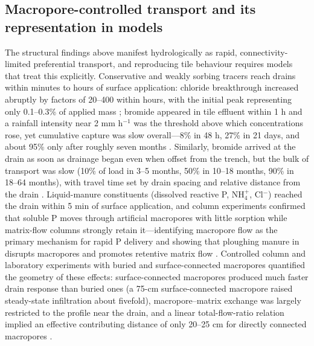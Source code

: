 \subsection{Macropore-controlled transport and its representation in models}

The structural findings above manifest hydrologically as rapid, connectivity-limited
preferential transport, and reproducing tile behaviour requires models that treat this
explicitly. Conservative and weakly sorbing tracers reach drains within minutes to
hours of surface application: chloride breakthrough increased abruptly by factors of
20--400 within hours, with the initial peak representing only 0.1--0.3\% of applied
mass \parencite{Villholth1998}; bromide appeared in tile effluent within 1 h and a
rainfall intensity near 2 mm h$^{-1}$ was the threshold above which concentrations
rose, yet cumulative capture was slow overall---8\% in 48 h, 27\% in 21 days, and
about 95\% only after roughly seven months \parencite{Frey2012}. Similarly, bromide
arrived at the drain as soon as drainage began even when offset from the trench, but
the bulk of transport was slow (10\% of load in 3--5 months, 50\% in 10--18 months,
90\% in 18--64 months), with travel time set by drain spacing and relative distance
from the drain \parencite{Kladivko2023}. Liquid-manure constituents (dissolved
reactive P, NH$_4^+$, Cl$^-$) reached the drain within 5 min of surface application,
and column experiments confirmed that soluble P moves through artificial macropores
with little sorption while matrix-flow columns strongly retain it---identifying
macropore flow as the primary mechanism for rapid P delivery and showing that ploughing
manure in disrupts macropores and promotes retentive matrix flow
\parencite{Stamm2002,Geohring2001}. Controlled column and laboratory experiments with
buried and surface-connected macropores quantified the geometry of these effects:
surface-connected macropores produced much faster drain response than buried ones (a
75-cm surface-connected macropore raised steady-state infiltration about fivefold),
macropore--matrix exchange was largely restricted to the profile near the drain, and
a linear total-flow-ratio relation implied an effective contributing distance of only
20--25 cm for directly connected macropores \parencite{Akay2007,Akay2008}.

